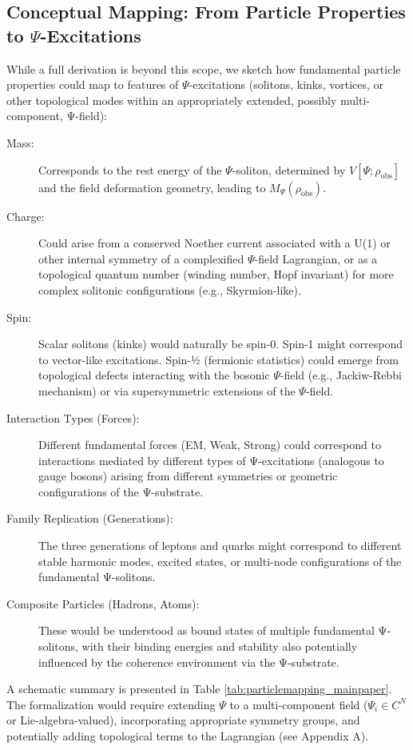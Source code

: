 \documentclass[11pt, a4paper]{book}
\begin{document}
\subsection{Conceptual Mapping: From Particle Properties to $\Psi$-Excitations}
\label{ssec:particles_conceptualmapping_mainpaper}
While a full derivation is beyond this scope, we sketch how fundamental particle properties could map to features of $\Psi$-excitations (solitons, kinks, vortices, or other topological modes within an appropriately extended, possibly multi-component, Ψ-field):
\begin{description}
    \item[Mass:] Corresponds to the rest energy of the $\Psi$-soliton, determined by $V[\Psi; \rho_{\text{obs}}]$ and the field deformation geometry, leading to $M_\Psi(\rho_{\text{obs}})$.
    \item[Charge:] Could arise from a conserved Noether current associated with a U(1) or other internal symmetry of a complexified $\Psi$-field Lagrangian, or as a topological quantum number (winding number, Hopf invariant) for more complex solitonic configurations (e.g., Skyrmion-like).
    \item[Spin:] Scalar solitons (kinks) would naturally be spin-0. Spin-1 might correspond to vector-like excitations. Spin-½ (fermionic statistics) could emerge from topological defects interacting with the bosonic $\Psi$-field (e.g., Jackiw-Rebbi mechanism) or via supersymmetric extensions of the $\Psi$-field.
    \item[Interaction Types (Forces):] Different fundamental forces (EM, Weak, Strong) could correspond to interactions mediated by different types of Ψ-excitations (analogous to gauge bosons) arising from different symmetries or geometric configurations of the Ψ-substrate.
    \item[Family Replication (Generations):] The three generations of leptons and quarks might correspond to different stable harmonic modes, excited states, or multi-node configurations of the fundamental Ψ-solitons.
    \item[Composite Particles (Hadrons, Atoms):] These would be understood as bound states of multiple fundamental Ψ-solitons, with their binding energies and stability also potentially influenced by the coherence environment via the Ψ-substrate.
\end{description}
A schematic summary is presented in Table \ref{tab:particlemapping_mainpaper}. The formalization would require extending $\Psi$ to a multi-component field ($\Psi_i \in C^N$ or Lie-algebra-valued), incorporating appropriate symmetry groups, and potentially adding topological terms to the Lagrangian (see Appendix A).
\end{document}
